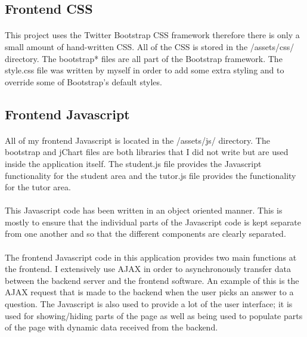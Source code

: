 \documentclass[10pt]{report}
\begin{document}
	\subsection*{Frontend CSS}
	\paragraph{}
	This project uses the Twitter Bootstrap CSS framework therefore there is only a small amount of
	hand-written CSS.  All of the CSS is stored in the /assets/css/ directory.  The bootstrap* files are
	all part of the Bootstrap framework.  The style.css file was written by myself in order to add some
	extra styling and to override some of Bootstrap's default styles.
	
	\subsection*{Frontend Javascript}
	\paragraph{}
	All of my frontend Javascript is located in the /assets/js/ directory.  The bootstrap and jChart files
	are both libraries that I did not write but are used inside the application itself.   The student.js
	file provides the Javascript functionality for the student area and the tutor.js file provides the
	functionality for the tutor area.
	
	\paragraph{}
	This Javascript code has been written in an object oriented manner.  This is mostly to ensure that
	the individual parts of the Javascript code is kept separate from one another and so that the
	different components are clearly separated.
	
	\paragraph{}
	The frontend Javascript code in this application provides two main functions at the frontend.  I
	extensively	use AJAX in order to asynchronously transfer data between the backend server and the
	frontend software.  An example of this is the AJAX request that is made to the backend when the user
	picks an answer to a question.  The Javascript is also used to provide a lot of the user interface; it
	is used	for showing/hiding parts of the page as well as being used to populate parts of the page with
    dynamic data received from the backend.
    
\end{document}
